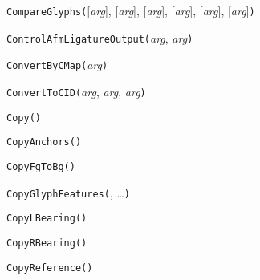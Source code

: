 
\texttt{CompareGlyphs(}[\textit{arg}], [\textit{arg}], [\textit{arg}], [\textit{arg}], [\textit{arg}], [\textit{arg}]\texttt{)}



\texttt{ControlAfmLigatureOutput(}\textit{arg}, \textit{arg}\texttt{)}



\texttt{ConvertByCMap(}\textit{arg}\texttt{)}



\texttt{ConvertToCID(}\textit{arg}, \textit{arg}, \textit{arg}\texttt{)}



\texttt{Copy(}\texttt{)}



\texttt{CopyAnchors(}\texttt{)}



\texttt{CopyFgToBg(}\texttt{)}



\texttt{CopyGlyphFeatures(}, \ldots\texttt{)}



\texttt{CopyLBearing(}\texttt{)}



\texttt{CopyRBearing(}\texttt{)}



\texttt{CopyReference(}\texttt{)}



